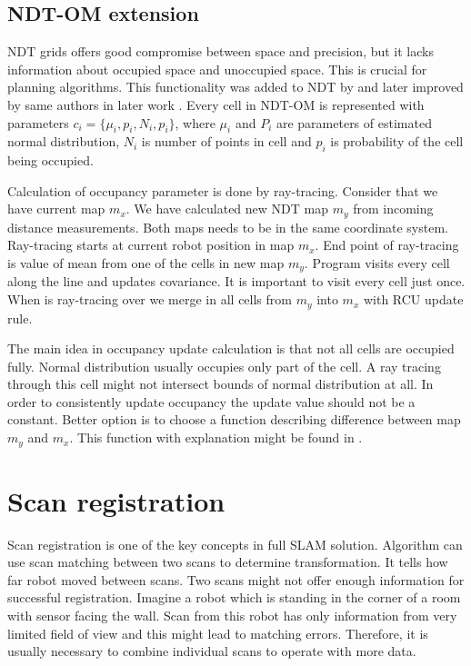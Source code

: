 \subsection{NDT-OM extension}
NDT grids offers good compromise between space and precision, but it lacks information about occupied space and unoccupied space. This is crucial for planning algorithms. This functionality was added to NDT by \cite{Saarinen13} and later improved by same authors in later work \cite{Saarinen213}. Every cell in \gls{NDT-OM} is represented with parameters $c_{i}=\{\mu_{i}, p_{i}, N_{i},p_{i}\}$, where $\mu_{i}$ and $P_{i}$ are parameters of estimated normal distribution, $N_{i}$ is number of points in cell and $p_{i}$ is probability of the cell being occupied. 

Calculation of occupancy parameter is done by ray-tracing. Consider that we have current map $m_{x}$. We have calculated new NDT map $m_{y}$ from incoming distance measurements. Both maps needs to be in the same coordinate system. Ray-tracing starts at current robot position in map $m_{x}$. End point of ray-tracing is value of mean from one of the cells in new map $m_{y}$. Program visits every cell along the line and updates covariance. It is important to visit every cell just once. When is ray-tracing over we merge in all cells from $m_{y}$ into $m_{x}$ with RCU update rule.

The main idea in occupancy update calculation is that not all cells are occupied fully. Normal distribution usually occupies only part of the cell. A ray tracing through this cell might not intersect bounds of normal distribution at all. In order to consistently update occupancy the update value should not be a constant. Better option is to choose a function describing difference between map $m_{y}$ and $m_{x}$. This function with explanation might be found in \cite{Saarinen213}.



\newpage   
\section{Scan registration}
\label{Scan_reg}
Scan registration is one of the key concepts in full SLAM solution. Algorithm can use scan matching between two scans to determine transformation. It tells how far robot moved between scans. Two scans might not offer enough information for successful registration. Imagine a robot which is standing in the corner of a room with sensor facing the wall. Scan from this robot has only information from very limited field of view and this might lead to matching errors. Therefore, it is usually necessary to combine individual scans to operate with more data.  

